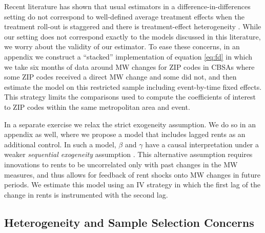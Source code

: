 Recent literature has shown that usual estimators in a difference-in-differences 
setting do not correspond to well-defined average treatment effects when the 
treatment roll-out is staggered and there is treatment-effect heterogeneity 
\parencite{deChaisemartinEtAl2022,RothEtAl2022}.
While our setting does not correspond exactly to the models discussed in this
literature, we worry about the validity of our estimator.
To ease these concerns, in an appendix we construct a ``stacked'' implementation 
of equation \eqref{eq:fd} in which we take six months of data around MW changes 
for ZIP codes in CBSAs where some ZIP codes received a direct MW change and 
some did not, 
and then estimate the model on this restricted sample including event-by-time 
fixed effects.
This strategy limits the comparisons used to compute the coefficients of 
interest to ZIP codes within the same metropolitan area and event.

In a separate exercise we relax the strict exogeneity assumption.
We do so in an appendix as well, where we propose a model that includes 
lagged rents as an additional control.
In such a model, $\beta$ and $\gamma$ have a causal interpretation under a 
weaker \textit{sequential exogeneity} assumption
\parencite{ArellanoBond1991, ArellanoHonore2001}.
This alternative assumption requires innovations to rents to be uncorrelated 
only with past changes in the MW measures, and thus allows for feedback of 
rent shocks onto MW changes in future periods.
We estimate this model using an IV strategy in which the first lag of the 
change in rents is instrumented with the second lag.


\subsection{Heterogeneity and Sample Selection Concerns}\label{sec:emp_start_heterogeneity}

